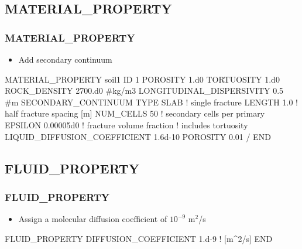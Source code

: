 \documentclass{beamer}
\newcommand\bluecomment[1]{{{\color{blue} #1}}}
\newcommand\magentacomment[1]{{{\color{magenta} #1}}}
\begin{document}
\subsection{MATERIAL\_PROPERTY}

\begin{frame}\frametitle{MATERIAL\_PROPERTY}

\begin{itemize}
  \item Add secondary continuum
\end{itemize}

\begin{semiverbatim}
MATERIAL_PROPERTY soil1
  ID 1
  POROSITY 1.d0
  TORTUOSITY 1.d0
  ROCK_DENSITY 2700.d0 #kg/m3
  LONGITUDINAL_DISPERSIVITY 0.5 #m
  \magentacomment{SECONDARY_CONTINUUM
    TYPE SLAB               \bluecomment{! single fracture}
    LENGTH 1.0              \bluecomment{! half fracture spacing [m]}
    NUM_CELLS 50            \bluecomment{! secondary cells per primary}
    EPSILON 0.00005d0       \bluecomment{! fracture volume fraction}
    \bluecomment{! includes tortuosity}
    LIQUID_DIFFUSION_COEFFICIENT 1.6d-10  
    POROSITY 0.01
  / }
END
\end{semiverbatim}

\end{frame}

\subsection{FLUID\_PROPERTY}

\begin{frame}\frametitle{FLUID\_PROPERTY}

\begin{itemize}
  \item Assign a molecular diffusion coefficient of $10^{-9}$ m$^2$/s
\end{itemize}

\begin{semiverbatim}

FLUID_PROPERTY
  DIFFUSION_COEFFICIENT 1.d-9   \bluecomment{! [m^2/s]}
END
\end{semiverbatim}

\end{frame}

\end{document}
